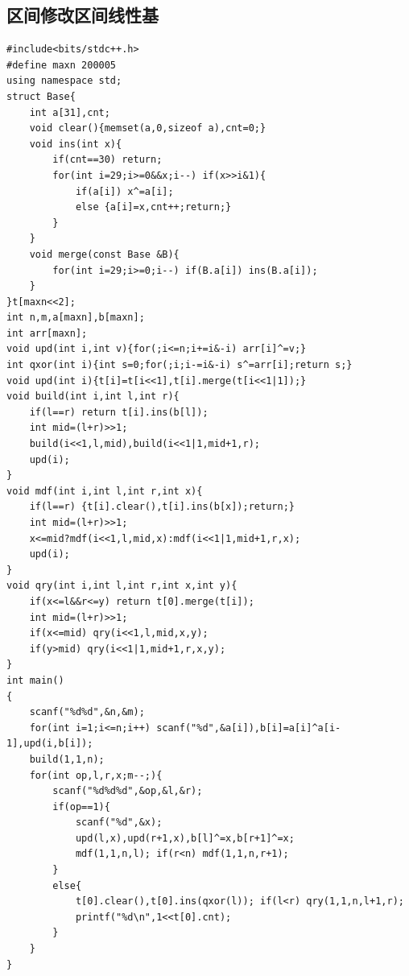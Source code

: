\documentclass[twoside]{article}
\begin{document}
\subsection{区间修改区间线性基}
\begin{lstlisting}
#include<bits/stdc++.h>
#define maxn 200005
using namespace std;
struct Base{
	int a[31],cnt;
	void clear(){memset(a,0,sizeof a),cnt=0;}
	void ins(int x){
		if(cnt==30) return;
		for(int i=29;i>=0&&x;i--) if(x>>i&1){
			if(a[i]) x^=a[i];
			else {a[i]=x,cnt++;return;}
		}
	}
	void merge(const Base &B){
		for(int i=29;i>=0;i--) if(B.a[i]) ins(B.a[i]);
	}
}t[maxn<<2];
int n,m,a[maxn],b[maxn];
int arr[maxn];
void upd(int i,int v){for(;i<=n;i+=i&-i) arr[i]^=v;}
int qxor(int i){int s=0;for(;i;i-=i&-i) s^=arr[i];return s;}
void upd(int i){t[i]=t[i<<1],t[i].merge(t[i<<1|1]);}
void build(int i,int l,int r){
	if(l==r) return t[i].ins(b[l]);
	int mid=(l+r)>>1;
	build(i<<1,l,mid),build(i<<1|1,mid+1,r);
	upd(i);
}
void mdf(int i,int l,int r,int x){
	if(l==r) {t[i].clear(),t[i].ins(b[x]);return;}
	int mid=(l+r)>>1;
	x<=mid?mdf(i<<1,l,mid,x):mdf(i<<1|1,mid+1,r,x);
	upd(i);
}
void qry(int i,int l,int r,int x,int y){
	if(x<=l&&r<=y) return t[0].merge(t[i]);
	int mid=(l+r)>>1;
	if(x<=mid) qry(i<<1,l,mid,x,y);
	if(y>mid) qry(i<<1|1,mid+1,r,x,y);
}
int main()
{
	scanf("%d%d",&n,&m);
	for(int i=1;i<=n;i++) scanf("%d",&a[i]),b[i]=a[i]^a[i-1],upd(i,b[i]);
	build(1,1,n);
	for(int op,l,r,x;m--;){
		scanf("%d%d%d",&op,&l,&r);
		if(op==1){
			scanf("%d",&x);
			upd(l,x),upd(r+1,x),b[l]^=x,b[r+1]^=x;
			mdf(1,1,n,l); if(r<n) mdf(1,1,n,r+1);
		}
		else{
			t[0].clear(),t[0].ins(qxor(l)); if(l<r) qry(1,1,n,l+1,r);
			printf("%d\n",1<<t[0].cnt);
		}
	}
}
\end{lstlisting}
\end{document}
